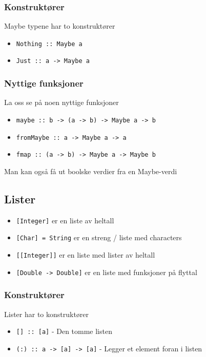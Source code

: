 \documentclass{article}
\begin{document}
\subsubsection{Konstruktører}

Maybe typene har to konstruktører
\begin{itemize}
    \item \texttt{Nothing :: Maybe a}
    \item \texttt{Just :: a -> Maybe a}
\end{itemize}

\subsubsection{Nyttige funksjoner}

La oss se på noen nyttige funksjoner

\begin{itemize}
    \item \texttt{maybe :: b -> (a -> b) -> Maybe a -> b}
    \item \texttt{fromMaybe :: a -> Maybe a -> a}
    \item \texttt{fmap :: (a -> b) -> Maybe a -> Maybe b}
\end{itemize}

Man kan også få ut boolske verdier fra en Maybe-verdi

\subsection{Lister}

\begin{itemize}
    \item \texttt{[Integer]} er en liste av heltall
    \item \texttt{[Char] = String} er en streng / liste med characters 
    \item \texttt{[[Integer]]} er en liste med lister av heltall
    \item \texttt{[Double -> Double]} er en liste med funksjoner på flyttal
\end{itemize}

\subsubsection{Konstruktører}

Lister har to konstruktører

\begin{itemize}
    \item \texttt{[] :: [a]} - Den tomme listen
    \item \texttt{(:) :: a -> [a] -> [a]} - Legger et element foran i listen
\end{itemize}
\end{document}

